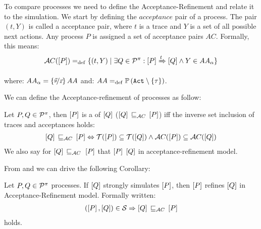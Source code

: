 To compare \picalc{} processes we need to define the Acceptance-Refinement and relate it to the simulation. We start by defining the $acceptance$ pair of a process.
The pair $(t, Y)$ is called a acceptance pair, where $t$ is a trace and $Y$ is a set of all possible next actions. Any process
$P$ is assigned a set of acceptance pairs $AC$. Formally, this means:
\begin{align}
    \accepatances[P] \define \{(t,Y) \mid \exists Q\in\procs: \ec{P} \bigstep{t} \ec{Q}\wedge Y\in AA_\alpha\}
\label{failure}
\end{align}

where: $AA_\alpha = \left\{\nicefrac{\vec{y}}{\vec{z}}\right\} AA$
and: $AA \define \pom{\actions\setminus\set{\tau}}$.

We can define the Acceptance-refinement of \picalc{} processes as follow:

\begin{definition}
\label{def_failure_ref}
	Let $P,Q\in\mathcal P^{\pi}$, then $\left[P\right]$ is a  of $\left[Q\right]$ ($\ec{Q}\refiAC \ec{P}$) iff the inverse set inclusion of traces and acceptances holds:
\begin{align}
   \ec{Q} \refiAC \ec{P} \Leftrightarrow  \traces[P]\subseteq\traces[Q] \wedge \accepatances[P]\subseteq\accepatances[Q]
\end{align}
	We also say for $\ec{Q}\refiAC{}\ec{P}$ that $\left[P\right]$  $\left[Q\right]$ in acceptance-refinement model.
\end{definition}

From  and  we can drive the following Corollary: 

\begin{cor}
\label{cor_sim_acceptance_refinement}
Let $P,Q\in\mathcal P^{\pi}$ processes. If $\left[Q\right]$ strongly simulates $\left[P\right]$, then $\left[P\right]$ refines $\left[Q\right]$ in Acceptance-Refinement model. Formally written:
\begin{align}
    (\ec{P},\ec{Q})\in{}\simu \Rightarrow \ec{Q} \refiAC \ec{P}
   \label{acceptance_model}
\end{align}
holds.
\end{cor}%

